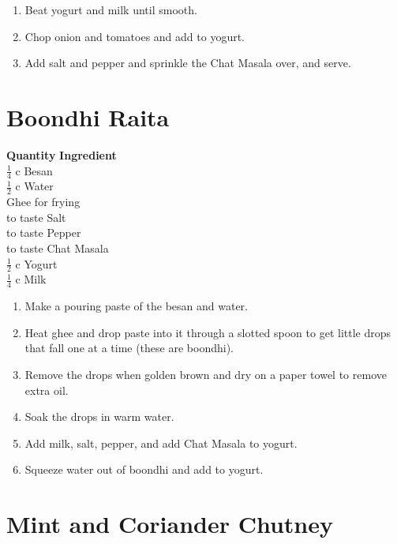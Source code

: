 \begin{enumerate}
\item  Beat yogurt and milk until smooth.
\item  Chop onion and tomatoes and add to yogurt.
\item  Add salt and pepper and sprinkle the Chat Masala over, and serve.
\end{enumerate}

\section{Boondhi Raita}

\begin{tabbing}

\hspace{1.0cm}  \={\bf Quantity}   \hspace{3.0cm} \={\bf Ingredient}\\
\> $\frac{1}{4}$ c \> Besan\\
\> $\frac{1}{2}$ c \> Water\\
\> \> Ghee for frying\\
\> to taste \> Salt\\
\> to taste\> Pepper\\
\> to taste\> Chat Masala \\
 $\frac{1}{2}$ c \>  Yogurt\\
\> $\frac{1}{4}$ c \> Milk\\
\end{tabbing}

\begin{enumerate}
\item  Make a pouring paste of the besan and water.
\item Heat ghee and drop paste into it through a
slotted spoon to get little drops that fall one at a time (these are boondhi).
\item Remove the drops when golden brown and dry on a paper towel to
remove extra oil.
\item Soak the drops in warm water.
\item Add milk, salt, pepper, and add Chat Masala to yogurt.
\item Squeeze water out of boondhi and add to yogurt.
\end{enumerate}

\section{Mint and Coriander Chutney}

